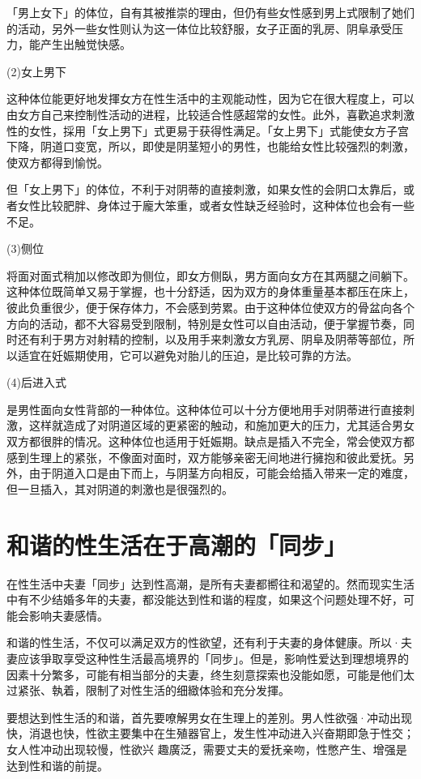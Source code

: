 \documentclass[12pt,UTF8]{ctexbook}
\begin{document}
「男上女下」的体位，自有其被推崇的理由，但仍有些女性感到男上式限制了她们的活动，另外一些女性则认为这一体位比较舒服，女子正面的乳房、阴阜承受压力，能产生出触觉快感。

(2)女上男下

这种体位能更好地发揮女方在性生活中的主观能动性，因为它在很大程度上，可以由女方自己来控制性活动的进程，比较适合性感超常的女性。此外，喜歡追求刺激性的女性，採用「女上男下」式更易于获得性满足。「女上男下」式能使女方子宫下降，阴道口变宽，所以，即使是阴茎短小的男性，也能给女性比较强烈的刺激，使双方都得到愉悦。

但「女上男下」的体位，不利于对阴蒂的直接刺激，如果女性的会阴口太靠后，或者女性比较肥胖、身体过于龐大笨重，或者女性缺乏经验时，这种体位也会有一些不足。

(3)侧位

将面对面式稍加以修改即为侧位，即女方侧臥，男方面向女方在其两腿之间躺下。这种体位既简单又易于掌握，也十分舒适，因为双方的身体重量基本都压在床上，彼此负重很少，便于保存体力，不会感到劳累。由于这种体位使双方的骨盆向各个方向的活动，都不大容易受到限制，特別是女性可以自由活动，便于掌握节奏，同时还有利于男方对射精的控制，以及用手来刺激女方乳房、阴阜及阴蒂等部位，所以适宜在妊娠期使用，它可以避免对胎儿的压迫，是比较可靠的方法。

(4)后进入式

是男性面向女性背部的一种体位。这种体位可以十分方便地用手对阴蒂进行直接刺激，这样就造成了对阴道区域的更紧密的触动，和施加更大的压力，尤其适合男女双方都很胖的情况。这种体位也适用于妊娠期。缺点是插入不完全，常会使双方都感到生理上的紧张，不像面对面时，双方能够亲密无间地进行擁抱和彼此爱抚。另外，由于阴道入口是由下而上，与阴茎方向相反，可能会给插入带来一定的难度，但一旦插入，其对阴道的刺激也是很强烈的。

\section{和谐的性生活在于高潮的「同步」}

在性生活中夫妻「同步」达到性高潮，是所有夫妻都嚮往和渴望的。然而现实生活中有不少结婚多年的夫妻，都没能达到性和谐的程度，如果这个问题处理不好，可能会影响夫妻感情。

和谐的性生活，不仅可以满足双方的性欲望，还有利于夫妻的身体健康。所以·夫妻应该爭取享受这种性生活最高境界的「同步」。但是，影响性爱达到理想境界的因素十分繁多，可能有相当部分的夫妻，终生刻意探索也没能如愿，可能是他们太过紧张、執着，限制了对性生活的细緻体验和充分发揮。

要想达到性生活的和谐，首先要嘹解男女在生理上的差別。男人性欲强·冲动出现快，消退也快，性欲主要集中在生殖器官上，发生性冲动进入兴奋期即急于性交；女人性冲动出现较慢，性欲兴
趣廣泛，需要丈夫的爱抚亲吻，性憋产生、增强是达到性和谐的前提。
\end{document}
